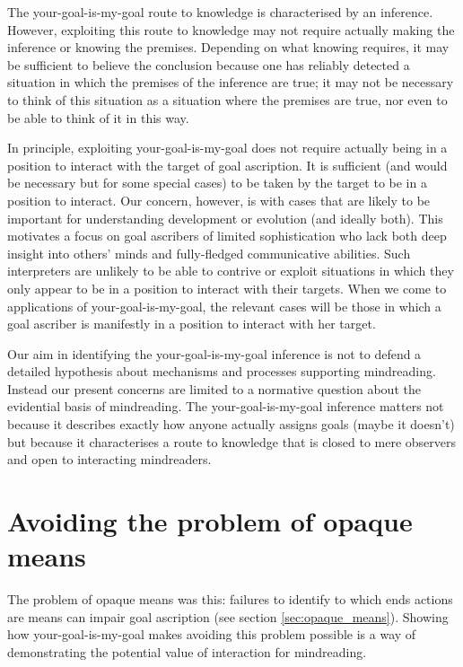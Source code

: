 \documentclass[14pt,a4paper]{extarticle}
\begin{document}
The your-goal-is-my-goal route to knowledge is characterised by an inference.  
However, exploiting this route to knowledge may not require actually making the inference or knowing the premises.  
Depending on what knowing requires,
it may be sufficient to believe the conclusion because one has reliably detected a situation in which the premises of the inference are true;
it may not be necessary to think of this situation as a situation where the premises are true,
nor even to be able to think of it in this way.

In principle,
exploiting your-goal-is-my-goal does not require actually being in a position to interact with the target of goal ascription.
It is sufficient (and would be necessary but for some special cases) to be taken by the target to be in a position to interact. 
Our concern, however,
is with cases that are likely to be important for understanding
development or evolution (and ideally both).
This motivates a focus on goal ascribers of limited sophistication
who lack both deep insight into others' minds and fully-fledged communicative abilities.
Such interpreters are unlikely to be able to contrive or exploit situations in which they only appear to be in a position to interact with their targets.
When we come to applications of your-goal-is-my-goal, the relevant cases will be those 
in which a goal ascriber is manifestly in a position to interact with her target.


Our aim in identifying the your-goal-is-my-goal inference is not to 
defend a detailed hypothesis about  mechanisms and processes supporting mindreading.
Instead our present concerns are limited to a normative question about the evidential basis of mindreading.
The your-goal-is-my-goal inference matters
not because it describes exactly how anyone actually assigns goals (maybe it doesn't)
but because 
it characterises a route to knowledge
that is closed to mere observers
and open to interacting mindreaders.
 

\section{Avoiding the problem of opaque means}

The problem of opaque means was this:
 failures to identify to which ends actions are means can impair goal ascription (see section \vref{sec:opaque_means}).
Showing how your-goal-is-my-goal makes  avoiding this problem possible is a way of demonstrating the potential value   of interaction for mindreading. 
\end{document}

